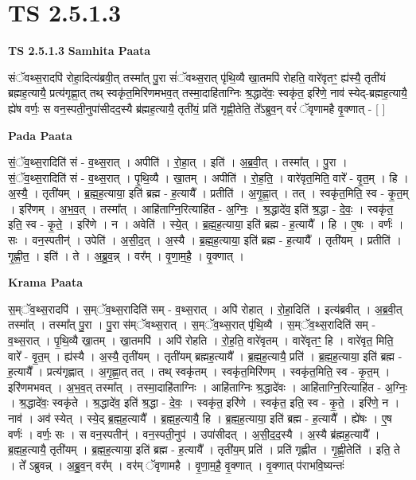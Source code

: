 \documentclass[17pt]{extarticle}
\begin{document}
\section{ TS 2.5.1.3 }

\textbf{TS 2.5.1.3 } \newline
\textbf{Samhita Paata} \newline

संॅवथ्स॒रादपि॑ रोहा॒दित्य॑ब्रवी॒त् तस्मा᳚त् पु॒रा सं॑ॅवथ्स॒रात् पृ॑थि॒व्यै खा॒तमपि॑ रोहति॒ वारे॑वृतꣳ॒॒ ह्य॑स्यै॒ तृती॑यं ब्रह्मह॒त्यायै॒ प्रत्य॑गृह्णा॒त् तथ् स्वकृ॑त॒मिरि॑णमभव॒त् तस्मा॒दाहि॑ताग्निः श्र॒द्धादे॑वः॒ स्वकृ॑त॒ इरि॑णे॒ नाव॑ स्येद्-ब्रह्मह॒त्यायै॒ ह्ये॑ष वर्णः॒ स वन॒स्पती॒नुपा॑सीदद॒स्यै ब्र॑ह्मह॒त्यायै॒ तृती॑यं॒ प्रति॑ गृह्णी॒तेति॒ ते᳚ऽब्रुव॒न् वरं॑ ॅवृणामहै वृ॒क्णात् - [  ] \newline

\textbf{Pada Paata} \newline

सं॒ॅव॒थ्स॒रादिति॑ सं - व॒थ्स॒रात् । अपीति॑ । रो॒हा॒त् । इति॑ । अ॒ब्र॒वी॒त् । तस्मा᳚त् । पु॒रा । सं॒ॅव॒थ्स॒रादिति॑ सं - व॒थ्स॒रात् । पृ॒थि॒व्यै । खा॒तम् । अपीति॑ ।  रो॒ह॒ति॒ । वारे॑वृत॒मिति॒ वारे᳚ - वृ॒त॒म् । हि ।  अ॒स्यै॒ । तृती॑यम् । ब्र॒ह्म॒ह॒त्याया॒ इति॑ ब्रह्म - ह॒त्यायै᳚ । प्रतीति॑ । अ॒गृ॒ह्णा॒त् । तत् । स्वकृ॑त॒मिति॒ स्व - कृ॒त॒म् । इरि॑णम् । अ॒भ॒व॒त् । तस्मा᳚त् । आहि॑ताग्नि॒रित्याहि॑त - अ॒ग्निः॒ । श्र॒द्धादे॑व॒ इति॑ श्र॒द्धा - दे॒वः॒ । स्वकृ॑त॒ इति॒ स्व - कृ॒ते॒ । इरि॑णे । न । अवेति॑ । स्ये॒त् । ब्र॒ह्म॒ह॒त्याया॒ इति॑ ब्रह्म - ह॒त्यायै᳚ । हि । ए॒षः । वर्णः॑ । सः । वन॒स्पतीन्॑ । उपेति॑ । अ॒सी॒द॒त् । अ॒स्यै । ब्र॒ह्म॒ह॒त्याया॒ इति॑ ब्रह्म - ह॒त्यायै᳚ । तृती॑यम् । प्रतीति॑ । गृ॒ह्णी॒त॒ । इति॑ । ते । अ॒ब्रु॒व॒न्न् । वर᳚म् । वृ॒णा॒म॒है॒ । वृ॒क्णात् ।  \newline


\textbf{Krama Paata} \newline

स॒म्ॅव॒थ्स॒रादपि॑ । स॒म्ॅव॒थ्स॒रादिति॑ सम् - व॒थ्स॒रात् । अपि॑ रोहात् । रो॒हा॒दिति॑ । इत्य॑ब्रवीत् । अ॒ब्र॒वी॒त् तस्मा᳚त् । तस्मा᳚त् पु॒रा । पु॒रा स॑म्ॅवथ्स॒रात् । स॒म्ॅव॒थ्स॒रात् पृ॑थि॒व्यै । स॒म्ॅव॒थ्स॒रादिति॑ सम् - व॒थ्स॒रात् । पृ॒थि॒व्यै खा॒तम् । खा॒तमपि॑ । अपि॑ रोहति । रो॒ह॒ति॒ वारे॑वृतम् । वारे॑वृतꣳ॒॒ हि । वारे॑वृत॒ मिति॒ वारे᳚ - वृ॒त॒म् । ह्य॑स्यै । अ॒स्यै॒ तृती॑यम् । तृती॑यम् ब्रह्मह॒त्यायै᳚ । ब्र॒ह्म॒ह॒त्यायै॒ प्रति॑ । ब्र॒ह्म॒ह॒त्याया॒ इति॑ ब्रह्म - ह॒त्यायै᳚ । प्रत्य॑गृह्णात् । अ॒गृ॒ह्णा॒त् तत् । तथ् स्वकृ॑तम् । स्वकृ॑त॒मिरि॑णम् । स्वकृ॑त॒मिति॒ स्व - कृ॒त॒म् । इरि॑णमभवत् । अ॒भ॒व॒त् तस्मा᳚त् । तस्मा॒दाहि॑ताग्निः । आहि॑ताग्निः श्र॒द्धादे॑वः । आहि॑ताग्नि॒रित्याहि॑त - अ॒ग्निः॒ । श्र॒द्धादे॑वः॒ स्वकृ॑ते । श्र॒द्धादे॑व॒ इति॑ श्र॒द्धा - दे॒वः॒ । स्वकृ॑त॒ इरि॑णे । स्वकृ॑त॒ इति॒ स्व - कृ॒ते॒ । इरि॑णे॒ न । नाव॑ । अव॑ स्येत् । स्ये॒द् ब्र॒ह्म॒ह॒त्यायै᳚ । ब्र॒ह्म॒ह॒त्यायै॒ हि । ब्र॒ह्म॒ह॒त्याया॒ इति॑ ब्रह्म - ह॒त्यायै᳚ । ह्ये॑षः । ए॒ष वर्णः॑ । वर्णः॒ सः । स वन॒स्पतीन्॑ । वन॒स्पती॒नुप॑ । उपा॑सीदत् । अ॒सी॒द॒द॒स्यै । अ॒स्यै ब्र॑ह्मह॒त्यायै᳚ । ब्र॒ह्म॒ह॒त्यायै॒ तृती॑यम् । ब्र॒ह्म॒ह॒त्याया॒ इति॑ ब्रह्म - ह॒त्यायै᳚ । तृती॑य॒म् प्रति॑ । प्रति॑ गृह्णीत । गृ॒ह्णी॒तेति॑ । इति॒ ते । ते᳚ ऽब्रुवन्न् । अ॒ब्रु॒व॒न् वर᳚म् । वर॑म् ॅवृणामहै । वृ॒णा॒म॒है॒ वृ॒क्णात् । वृ॒क्णात् प॑राभवि॒ष्यन्तः॑ \newline
\end{document}
